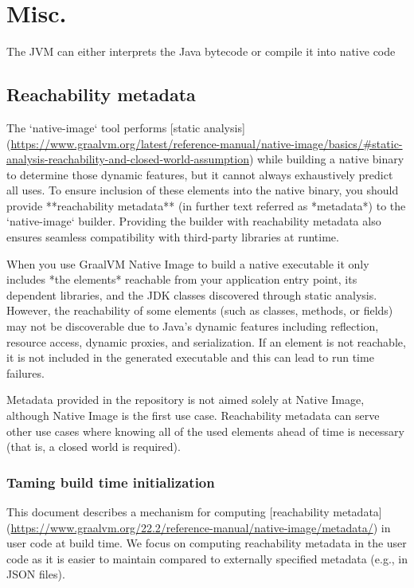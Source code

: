 \chapter{Misc.}
The JVM can either interprets the Java bytecode or compile it into native code
\section{Reachability metadata}

The `native-image` tool performs [static analysis](\url{https://www.graalvm.org/latest/reference-manual/native-image/basics/#static-analysis-reachability-and-closed-world-assumption}) while building a native binary to determine those dynamic features, but it cannot always exhaustively predict all uses.
To ensure inclusion of these elements into the native binary, you should provide **reachability metadata** (in further text referred as *metadata*) to the `native-image` builder. 
Providing the builder with reachability metadata also ensures seamless compatibility with third-party libraries at runtime.

When you use GraalVM Native Image to build a native executable it only includes *the elements* reachable from your application entry point, its dependent libraries, and the JDK classes discovered through static analysis. However, the reachability of some elements (such as classes, methods, or fields) may not be discoverable due to Java’s dynamic features including reflection, resource access, dynamic proxies, and serialization. If an element is not reachable, it is not included in the generated executable and this can lead to run time failures.

Metadata provided in the repository is not aimed solely at Native Image, although Native Image is the first use case. Reachability metadata can serve other use cases where knowing all of the used elements ahead of time is necessary (that is, a closed world is required).


\subsection{Taming build time initialization}

This document describes a mechanism for computing [reachability metadata](\url{https://www.graalvm.org/22.2/reference-manual/native-image/metadata/}) in user code at build time. We focus on computing reachability metadata in the user code as it is easier to maintain compared to externally specified metadata (e.g., in JSON files).

